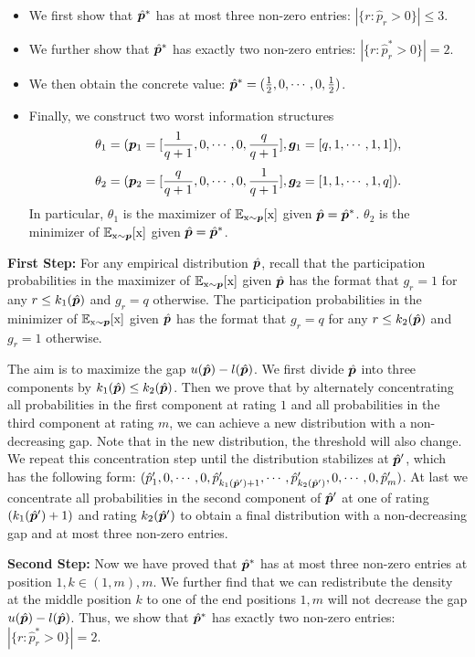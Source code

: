 \begin{itemize}
    \item We first show that $\hat{{\bm{p}}}^*$ has at most three non-zero entries: $|\{r:\hat{p}_r>0\}|\le 3$.
    \item We further show that $\hat{{\bm{p}}}^*$ has exactly two non-zero entries: $|\{r:\hat{p}_r^*>0\}|= 2$.
    \item We then obtain the concrete value: $\hat{{\bm{p}}}^*=(\frac{1}{2},0,\cdots,0,\frac{1}{2})$.
    \item Finally, we construct two worst information structures $$\theta_1=({\bm{p}}_1=[\frac{1}{q+1},0,\cdots,0,\frac{q}{q+1}],{\bm{g}}_1=[q,1,\cdots,1,1]),$$
    $$\theta_2=({\bm{p}}_2=[\frac{q}{q+1},0,\cdots,0,\frac{1}{q+1}],{\bm{g}}_2=[1,1,\cdots, 1,q]).$$ In particular, $\theta_1$ is the maximizer of $\mathbb{E}_{{\textnormal{x}}\sim{\bm{p}}}[{\textnormal{x}}]$ given $\hat{{\bm{p}}}=\hat{{\bm{p}}}^*$. $\theta_2$ is the minimizer of $\mathbb{E}_{{\textnormal{x}}\sim{\bm{p}}}[{\textnormal{x}}]$ given $\hat{{\bm{p}}}=\hat{{\bm{p}}}^*$. 
\end{itemize}

\textbf{First Step:} For any empirical distribution $\hat{{\bm{p}}}$, recall that the participation probabilities in the maximizer of $\mathbb{E}_{{\textnormal{x}}\sim{\bm{p}}}[{\textnormal{x}}]$ given $\hat{{\bm{p}}}$ has the format that $g_r=1$ for any $r\le k_1(\hat{{\bm{p}}})$ and $g_r=q$ otherwise. The participation probabilities in the minimizer of $\mathbb{E}_{{\textnormal{x}}\sim{\bm{p}}}[{\textnormal{x}}]$ given $\hat{{\bm{p}}}$ has the format that $g_r=q$ for any $r\le k_2(\hat{{\bm{p}}})$ and $g_r=1$ otherwise. 

The aim is to maximize the gap $u(\hat{{\bm{p}}})-l(\hat{{\bm{p}}})$. We first divide $\hat{{\bm{p}}}$ into three components by $k_1(\hat{{\bm{p}}})\leq k_2(\hat{{\bm{p}}})$. Then we prove that by alternately concentrating all probabilities in the first component at rating $1$ and all probabilities in the third component at rating $m$, we can achieve a new distribution with a non-decreasing gap. Note that in the new distribution, the threshold will also change. We repeat this concentration step until the distribution stabilizes at $\hat{{\bm{p}}}'$, which has the following form: $(\hat{p}_1',0,\cdots,0,\hat{p}_{k_1(\hat{{\bm{p}}}')+1}',\cdots,\hat{p}_{k_2(\hat{{\bm{p}}}')}',0,\cdots,0,\hat{p}_m')$. At last we concentrate all probabilities in the second component of $\hat{{\bm{p}}}'$ at one of rating $(k_1(\hat{{\bm{p}}}')+1)$ and rating $k_2(\hat{{\bm{p}}}')$ to obtain a final distribution with a non-decreasing gap and at most three non-zero entries.

\textbf{Second Step:} Now we have proved that $\hat{{\bm{p}}}^*$ has at most three non-zero entries at position $1,k\in(1,m),m$. We further find that we can redistribute the density at the middle position $k$ to one of the end positions $1,m$ will not decrease the gap $u(\hat{{\bm{p}}})-l(\hat{{\bm{p}}})$. Thus, we show that $\hat{{\bm{p}}}^*$ has exactly two non-zero entries: $|\{r:\hat{p}_r^*>0\}|= 2$.


